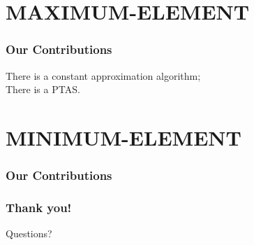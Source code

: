\documentclass[serif,envcountsect]{beamer}
\begin{document}
\section{MAXIMUM-ELEMENT}
\begin{frame}
\frametitle{Our Contributions}
\begin{theorem}
    There is a constant approximation algorithm;\\
    There is a PTAS.
\end{theorem}
\end{frame}

\begin{frame}

\end{frame}

\section{MINIMUM-ELEMENT}
\begin{frame}
\frametitle{Our Contributions}
\begin{theorem}
\end{theorem}
\end{frame}

\begin{frame}\frametitle{Thank you!}
Questions?
\end{frame}

\end{document}
